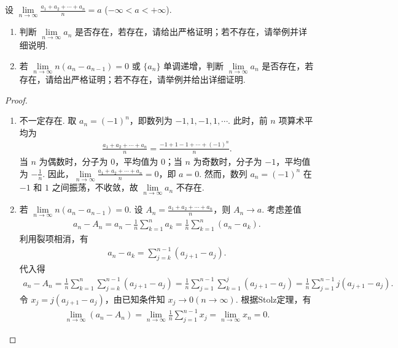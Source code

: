 \documentclass[../../main.tex]{subfiles}%
\begin{document}
\begin{example}
设 $\lim\limits_{n\to\infty} \frac{a_1+a_2+\cdots+a_n}{n} = a$ ($-\infty < a < +\infty$).
\begin{enumerate}[(1)]
\item 判断 $\lim\limits_{n\to\infty} a_n$ 是否存在，若存在，请给出严格证明；若不存在，请举例并详细说明.

\item 若 $\lim\limits_{n\to\infty} n(a_n - a_{n-1}) = 0$ 或 $\{a_n\}$ 单调递增，判断 $\lim\limits_{n\to\infty} a_n$ 是否存在，若存在，请给出严格证明；若不存在，请举例并给出详细证明.
\end{enumerate}
\end{example}
\begin{proof}
\begin{enumerate}[(1)]
\item 不一定存在.
取 $a_n = (-1)^n$，即数列为 $-1, 1, -1, 1, \cdots$.
此时，前 $n$ 项算术平均为
\begin{align*}
\frac{a_1+a_2+\cdots+a_n}{n} = \frac{-1+1-1+\cdots+(-1)^n}{n}.
\end{align*}
当 $n$ 为偶数时，分子为 $0$，平均值为 $0$；当 $n$ 为奇数时，分子为 $-1$，平均值为 $-\frac{1}{n}$.
因此，$\lim\limits_{n\to\infty} \frac{a_1+a_2+\cdots+a_n}{n} = 0$，即 $a=0$.
然而，数列 $a_n = (-1)^n$ 在 $-1$ 和 $1$ 之间振荡，不收敛，故 $\lim\limits_{n\to\infty} a_n$ 不存在.

\item 若 $\lim\limits_{n\to\infty} n(a_n - a_{n-1}) = 0$.
设 $A_n = \frac{a_1+a_2+\cdots+a_n}{n}$，则 $A_n \to a$.
考虑差值
\begin{align*}
a_n - A_n = a_n - \frac{1}{n}\sum\limits_{k=1}^n a_k = \frac{1}{n}\sum\limits_{k=1}^n (a_n - a_k).
\end{align*}
利用裂项相消，有
\begin{align*}
a_n - a_k = \sum\limits_{j=k}^{n-1} (a_{j+1} - a_j).
\end{align*}
代入得
\begin{align*}
a_n - A_n = \frac{1}{n}\sum\limits_{k=1}^n \sum\limits_{j=k}^{n-1} (a_{j+1} - a_j) = \frac{1}{n}\sum\limits_{j=1}^{n-1} \sum\limits_{k=1}^j (a_{j+1} - a_j) = \frac{1}{n}\sum\limits_{j=1}^{n-1} j(a_{j+1} - a_j).
\end{align*}
令 $x_j = j(a_{j+1} - a_j)$，由已知条件知 $x_j \to 0(n\to \infty)$.
根据Stolz定理，有
\begin{align*}
\lim_{n\rightarrow \infty} \left( a_n-A_n \right) =\lim_{n\rightarrow \infty} \frac{1}{n}\sum_{j=1}^{n-1}{x_j}=\lim_{n\rightarrow \infty} x_n=0.
\end{align*}


\end{enumerate}
\end{proof}
\end{document}
